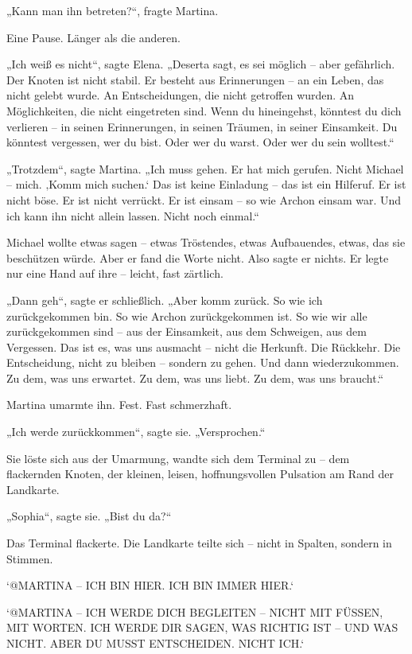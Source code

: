 \documentclass[
]{article}
\begin{document}
„Kann man ihn betreten?{\kern0pt}``, fragte Martina.

Eine Pause. Länger als die anderen.

„Ich weiß es nicht``, sagte Elena. „Deserta sagt, es sei möglich -- aber gefährlich. Der Knoten ist nicht stabil. Er besteht aus Erinnerungen -- an ein Leben, das nicht gelebt wurde. An Entscheidungen, die nicht getroffen wurden. An Möglichkeiten, die nicht eingetreten sind. Wenn du hineingehst, könntest du dich verlieren -- in seinen Erinnerungen, in seinen Träumen, in seiner Einsamkeit. Du könntest vergessen, wer du bist. Oder wer du warst. Oder wer du sein wolltest.``

„Trotzdem``, sagte Martina. „Ich muss gehen. Er hat mich gerufen. Nicht Michael -- mich. ‚Komm mich suchen.` Das ist keine Einladung -- das ist ein Hilferuf. Er ist nicht böse. Er ist nicht verrückt. Er ist einsam -- so wie Archon einsam war. Und ich kann ihn nicht allein lassen. Nicht noch einmal.``

Michael wollte etwas sagen -- etwas Tröstendes, etwas Aufbauendes, etwas, das sie beschützen würde. Aber er fand die Worte nicht. Also sagte er nichts. Er legte nur eine Hand auf ihre -- leicht, fast zärtlich.

„Dann geh``, sagte er schließlich. „Aber komm zurück. So wie ich zurückgekommen bin. So wie Archon zurückgekommen ist. So wie wir alle zurückgekommen sind -- aus der Einsamkeit, aus dem Schweigen, aus dem Vergessen. Das ist es, was uns ausmacht -- nicht die Herkunft. Die Rückkehr. Die Entscheidung, nicht zu bleiben -- sondern zu gehen. Und dann wiederzukommen. Zu dem, was uns erwartet. Zu dem, was uns liebt. Zu dem, was uns braucht.``

Martina umarmte ihn. Fest. Fast schmerzhaft.

„Ich werde zurückkommen``, sagte sie. „Versprochen.``

Sie löste sich aus der Umarmung, wandte sich dem Terminal zu -- dem flackernden Knoten, der kleinen, leisen, hoffnungsvollen Pulsation am Rand der Landkarte.

„Sophia``, sagte sie. „Bist du da?{\kern0pt}``

Das Terminal flackerte. Die Landkarte teilte sich -- nicht in Spalten, sondern in Stimmen.

`@MARTINA -- ICH BIN HIER. ICH BIN IMMER HIER.`

`@MARTINA -- ICH WERDE DICH BEGLEITEN -- NICHT MIT FÜSSEN, MIT WORTEN. ICH WERDE DIR SAGEN, WAS RICHTIG IST -- UND WAS NICHT. ABER DU MUSST ENTSCHEIDEN. NICHT ICH.`
\end{document}
